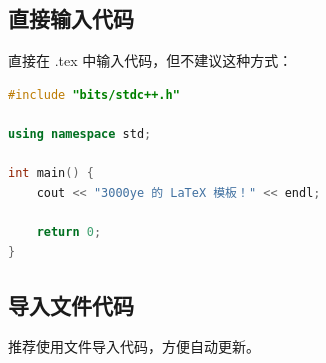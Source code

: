 \documentclass{resume/dhuBachelorclass}
\begin{document}
\subsection{直接输入代码}

直接在 .tex 中输入代码，但不建议这种方式：

\begin{lstlisting}[language=c++,title={code.cpp}]
#include "bits/stdc++.h"

using namespace std;

int main() {
    cout << "3000ye 的 LaTeX 模板！" << endl;

    return 0;
}
\end{lstlisting}

\subsection{导入文件代码}

推荐使用文件导入代码，方便自动更新。






\end{document}
